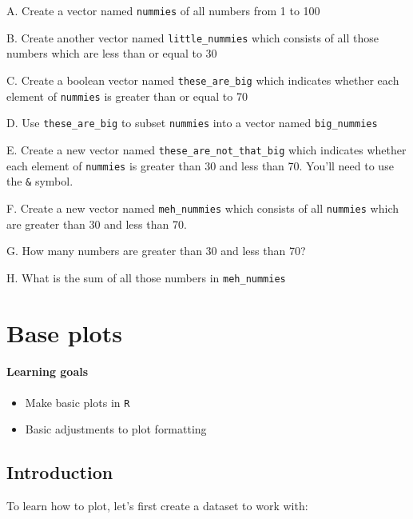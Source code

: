 \documentclass[
]{book}
\providecommand{\tightlist}{%
  \setlength{\itemsep}{0pt}\setlength{\parskip}{0pt}}
\begin{document}
A. Create a vector named \texttt{nummies} of all numbers from 1 to 100

B. Create another vector named \texttt{little\_nummies} which consists of all those numbers which are less than or equal to 30

C. Create a boolean vector named \texttt{these\_are\_big} which indicates whether each element of \texttt{nummies} is greater than or equal to 70

D. Use \texttt{these\_are\_big} to subset \texttt{nummies} into a vector named \texttt{big\_nummies}

E. Create a new vector named \texttt{these\_are\_not\_that\_big} which indicates whether each element of \texttt{nummies} is greater than 30 and less than 70. You'll need to use the \texttt{\&} symbol.

F. Create a new vector named \texttt{meh\_nummies} which consists of all \texttt{nummies} which are greater than 30 and less than 70.

G. How many numbers are greater than 30 and less than 70?

H. What is the sum of all those numbers in \texttt{meh\_nummies}

\hypertarget{base-plots}{%
\chapter{Base plots}\label{base-plots}}

\hypertarget{learning-goals-6}{%
\subsubsection*{Learning goals}\label{learning-goals-6}}

\begin{itemize}
\tightlist
\item
  Make basic plots in \texttt{R}
\item
  Basic adjustments to plot formatting
\end{itemize}

\hypertarget{introduction}{%
\section*{Introduction}\label{introduction}}

To learn how to plot, let's first create a dataset to work with:
\end{document}
